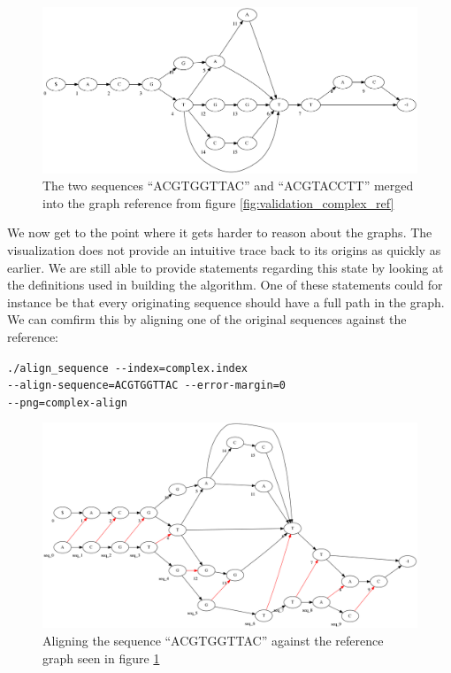 \documentclass[thesis.tex]{subfiles}
\begin{document}
\begin{figure}[H]
  \begin{mdframed}
    \includegraphics[width=\textwidth]{output/complex-merge.png}
  \end{mdframed}
  \caption{The two sequences ``ACGTGGTTAC'' and ``ACGTACCTT'' merged into the graph reference from figure \ref{fig:validation_complex_ref}}
  \label{fig:complex_2}
\end{figure}
\noindent
We now get to the point where it gets harder to reason about the graphs. The visualization does not provide an intuitive trace back to its origins as quickly as earlier. We are still able to provide statements regarding this state by looking at the definitions used in building the algorithm. One of these statements could for instance be that every originating sequence should have a full path in the graph. We can comfirm this by aligning one of the original sequences against the reference:\\
\par\noindent
\texttt{./align\_sequence -{}-index=complex.index \\
  -{}-align-sequence=ACGTGGTTAC -{}-error-margin=0 \\
  -{}-png=complex-align}
\begin{figure}[H]
  \begin{mdframed}
    \includegraphics[width=\textwidth]{output/complex-align.png}
  \end{mdframed}
  \caption{Aligning the sequence ``ACGTGGTTAC'' against the reference graph seen in figure \ref{fig:complex_2}}
\end{figure}
\end{document}
